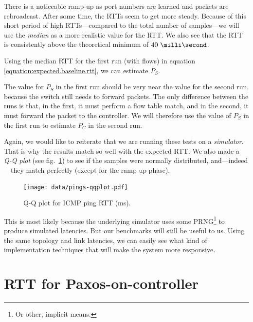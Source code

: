

There is a noticeable ramp-up as port numbers are learned and packets are
rebroadcast.  After some time, the \acs{RTT}s seem to get more steady.
Because of this short period of high \acs{RTT}s---compared to the total number of
samples---we will use the \textit{median} as a more realistic value for the
RTT. We also see that the RTT is consistently above the theoretical minimum
of $\ms{40}$.

Using the median RTT for the first run (with flows)
in equation \ref{equation:expected.baseline.rtt}, we can estimate $P_S$.



The value for $P_S$ in the first run should be very near the value for the
second run, because the switch still needs to forward packets.  The only
difference between the runs is that, in the first, it must perform a flow
table match, and in the second, it must forward the packet to the
controller.  We will therefore use the value of $P_S$ in the first run to
estimate $P_C$ in the second run.



Again, we would like to reiterate that we are running these tests on a
\textit{simulator}.  That is why the results match so well with the expected
\acs{RTT}.  We also made a \textit{Q-Q plot} (see
fig.~\ref{figure:pings.qqplot}) to see if the samples were normally
distributed, and---indeed---they match perfectly (except for the ramp-up
phase).

\begin{figure}[H]
  \centering
  \texttt{[image: data/pings-qqplot.pdf]}
  \caption{Q-Q plot for ICMP ping RTT (ms).}
  \label{figure:pings.qqplot}
\end{figure}

This is most likely because the underlying simulator uses some
\acf{PRNG}\footnote{Or other, implicit means.} to produce simulated latencies.  But our
benchmarks will still be useful to us.  Using the same topology and link
latencies, we can easily see what kind of implementation techniques that
will make the system more responsive.


\section{RTT for Paxos-on-controller}
\label{res:rtt.udp}

